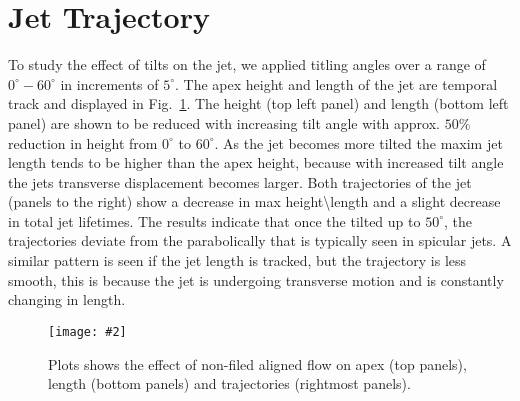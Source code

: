 \documentclass[12pt]{ociamthesis}
\newcommand{\mfig}[4]{
  \begin{figure}
  \begin{center}
  \texttt{[image: \#2]}
  \caption{#3}
  \label{#4}
  \end{center}
  \end{figure}}
\begin{document}
\section{Jet Trajectory}
\label{sec:j_traj_t}
To study the effect of tilts on the jet, we applied titling angles over a range of $0^{\circ}-60^{\circ}$ in increments of $5^{\circ}$. The apex height and length of the jet are temporal track and displayed in Fig.~\ref{tilt_effect_traj}. The height (top left panel) and length (bottom left panel) are shown to be reduced with increasing tilt angle with approx. $50\%$ reduction in height from $0^{\circ}$ to $60^{\circ}$. As the jet becomes more tilted the maxim jet length tends to be higher than the apex height, because with increased tilt angle the jets transverse displacement becomes larger. Both trajectories of the jet (panels to the right) show a decrease in max height\textbackslash length and a slight decrease in total jet lifetimes. The results indicate that once the tilted up to $50^{\circ}$, the trajectories deviate from the parabolically that is typically seen in spicular jets. A similar pattern is seen if the jet length is tracked, but the trajectory is less smooth, this is because the jet is undergoing transverse motion and is constantly changing in length.      
\mfig{0.8}{figures/image823.png}{Plots shows the effect of non-filed aligned flow on apex (top panels), length (bottom panels) and trajectories (rightmost panels).}{tilt_effect_traj}
\end{document}
